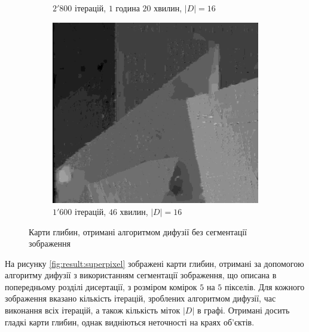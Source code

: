 \begin{figure}[h]
\begin{subfigure}[t]{0.32\textwidth}
        \caption{$2'800$ ітерацій, $1$ година $20$ хвилин, $\left| D \right| = 16$}
        \label{fig:flowerpots:pixel}
    \end{subfigure}
    \hfill
    \begin{subfigure}[t]{0.32\textwidth}
        \centering
        \includegraphics[width=\textwidth]{images/poster_pixel_based_stereo}
        \caption{$1'600$ ітерацій, $46$ хвилин, $\left| D \right| = 16$}
        \label{fig:poster:pixel}
    \end{subfigure}
    \caption{Карти глибин, отримані алгоритмом дифузії без сегментації зображення}
    \label{fig:result:pixel}
\end{figure}

На рисунку \ref{fig:result:superpixel} зображені карти глибин,
отримані за допомогою алгоритму дифузії з використанням сегментації зображення,
що описана в попередньому розділі дисертації,
з розміром комірок $5$ на $5$ пікселів.
Для кожного зображення вказано кількість ітерацій, зроблених алгоритмом дифузії,
час виконання всіх ітерацій, а також кількість міток $\left| D \right|$ в графі.
Отримані досить гладкі карти глибин,
однак видніються неточності на краях об'єктів.

